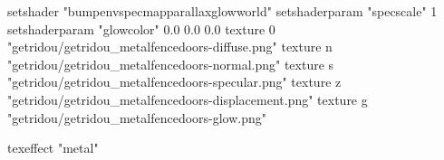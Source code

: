 setshader "bumpenvspecmapparallaxglowworld"
setshaderparam "specscale" 1
setshaderparam "glowcolor" 0.0 0.0 0.0
texture 0 "getridou/getridou_metalfencedoors-diffuse.png"
texture n "getridou/getridou_metalfencedoors-normal.png"
texture s "getridou/getridou_metalfencedoors-specular.png"
texture z "getridou/getridou_metalfencedoors-displacement.png"
texture g "getridou/getridou_metalfencedoors-glow.png"

texeffect "metal"
